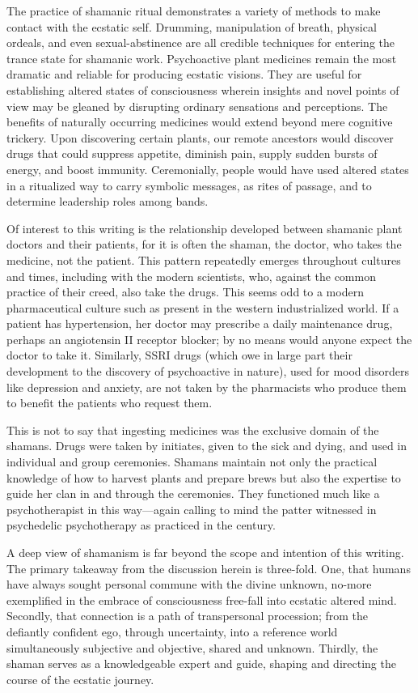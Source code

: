 \documentclass{UIdahoMastersThesis}
\begin{document}
The practice of shamanic ritual demonstrates a variety of methods to make contact with the ecstatic self. Drumming, manipulation of breath, physical ordeals, and even sexual-abstinence are all credible techniques for entering the trance state for shamanic work. Psychoactive plant medicines remain the most dramatic and reliable for producing ecstatic visions. They are useful for establishing altered states of consciousness wherein insights and novel points of view may be gleaned by disrupting ordinary sensations and perceptions. The benefits of naturally occurring medicines would extend beyond mere cognitive trickery. Upon discovering certain plants, our remote ancestors would discover drugs that could suppress appetite, diminish pain, supply sudden bursts of energy, and boost immunity. Ceremonially, people would have used altered states in a ritualized way to carry symbolic messages, as rites of passage, and to determine leadership roles among bands.

Of interest to this writing is the relationship developed between shamanic plant doctors and their patients, for it is often the shaman, the doctor, who takes the medicine, not the patient. This pattern repeatedly emerges throughout cultures and times, including with the modern scientists, who, against the common practice of their creed, also take the drugs. This seems odd to a modern pharmaceutical culture such as present in the western industrialized world. If a patient has hypertension, her doctor may prescribe a daily maintenance drug, perhaps an angiotensin II receptor blocker; by no means would anyone expect the doctor to take it. Similarly, SSRI drugs (which owe in large part their development to the discovery of psychoactive in nature), used for mood disorders like depression and anxiety, are not taken by the pharmacists who produce them to benefit the patients who request them.

This is not to say that ingesting medicines was the exclusive domain of the shamans. Drugs were taken by initiates, given to the sick and dying, and used in individual and group ceremonies. Shamans maintain not only the practical knowledge of how to harvest plants and prepare brews but also the expertise to guide her clan in and through the ceremonies. They functioned much like a psychotherapist in this way---again calling to mind the patter witnessed in psychedelic psychotherapy as practiced in the  century. 

A deep view of shamanism is far beyond the scope and intention of this writing. The primary takeaway from the discussion herein is three-fold. One, that humans have always sought personal commune with the divine unknown, no-more exemplified in the embrace of consciousness free-fall into ecstatic altered mind. Secondly, that connection is a path of transpersonal procession; from the defiantly confident ego, through uncertainty, into a reference world simultaneously subjective and objective, shared and unknown. Thirdly, the shaman serves as a knowledgeable expert and guide, shaping and directing the course of the ecstatic journey.
\end{document}
